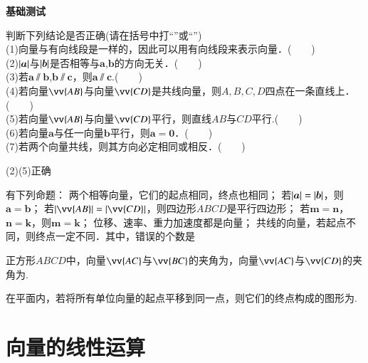   \begin{exercise}{\textbf{基础测试}}
    \item
      判断下列结论是否正确(请在括号中打“\checkmark”或“\XSolidBrush”)\\
      (1)向量与有向线段是一样的，因此可以用有向线段来表示向量．(　　)\\
      (2)$\left| \bm{a} \right|$与$\left| \bm{b} \right|$是否相等与$\bm{a}$,$\bm{b}$的方向无关．(　　)\\
      (3)若$\bm{a}\varparallel\bm{b}$,$\bm{b}\varparallel\bm{c}$，则$\bm{a}\varparallel\bm{c}$.(　　)\\
      (4)若向量$\vv{AB}$与向量$\vv{CD}$是共线向量，则$A,B,C,D$四点在一条直线上．(　　)\\
      (5)若向量$\vv{AB}$与向量$\vv{CD}$平行，则直线$AB$与$CD$平行.(　　)\\
      (6)若向量$\bm a$与任一向量$\bm b$平行，则$\bm a=\bm 0$．(　　)\\
      (7)若两个向量共线，则其方向必定相同或相反．(　　)
      \begin{answer}
        (2)(5)正确
      \end{answer}
    \item
      有下列命题：
      两个相等向量，它们的起点相同，终点也相同；
      若$\left| \bm{a} \right|=\left| \bm{b} \right|$，则$\bm{a}=\bm{b}$；
      若$\abs{\vv{AB}}=\abs{\vv{CD}}$，则四边形$ABCD$是平行四边形；
      若$\bm{m}=\bm{n}$，$\bm{n}=\bm{k}$，则$\bm{m}=\bm{k}$；
      位移、速率、重力加速度都是向量；
      共线的向量，若起点不同，则终点一定不同．其中，错误的个数是\xz
    \item
      正方形$ABCD$中，向量$\vv{AC}$与$\vv{BC}$的夹角为\tk，向量$\vv{AC}$与$\vv{CD}$的夹角为\tk.
    \item
      在平面内，若将所有单位向量的起点平移到同一点，则它们的终点构成的图形为\tk.
  \end{exercise}
\clearpage
\section{向量的线性运算}
